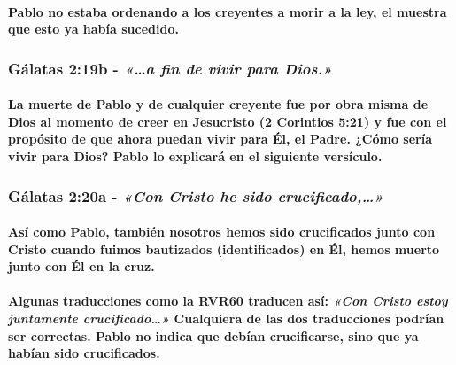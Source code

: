 \documentclass[11a pt,twoside]{article}
\newcommand{\scripture}[1]{%
  {\fontsize{12pt}{16pt}\selectfont\ScriptureFont\itshape #1}%
}
\let\oldsubsubsection\subsubsection
\renewcommand{\subsubsection}{\needspace{4\baselineskip}\oldsubsubsection}
\let\oldparagraph\paragraph
\renewcommand{\paragraph}{\needspace{3\baselineskip}\oldparagraph}
\begin{document}
\paragraph{Pablo no estaba ordenando a los creyentes a morir a la ley,
el muestra que esto ya había
sucedido.}\label{pablo-no-estaba-ordenando-a-los-creyentes-a-morir-a-la-ley-el-muestra-que-esto-ya-habuxeda-sucedido.}

\subsubsection{\texorpdfstring{Gálatas 2:19b -
\scripture{«…a fin de vivir para Dios.»}}{Gálatas 2:19b - }}\label{guxe1latas-219b---a-fin-de-vivir-para-dios.}

\paragraph{La muerte de Pablo y de cualquier creyente fue por obra misma
de Dios al momento de creer en Jesucristo (2 Corintios 5:21) y fue con
el propósito de que ahora puedan vivir para Él, el Padre. ¿Cómo sería
vivir para Dios? Pablo lo explicará en el siguiente
versículo.}\label{la-muerte-de-pablo-y-de-cualquier-creyente-fue-por-obra-misma-de-dios-al-momento-de-creer-en-jesucristo-2-corintios-521-y-fue-con-el-propuxf3sito-de-que-ahora-puedan-vivir-para-uxe9l-el-padre.-cuxf3mo-seruxeda-vivir-para-dios-pablo-lo-explicaruxe1-en-el-siguiente-versuxedculo.}

\subsubsection{\texorpdfstring{Gálatas 2:20a -
\scripture{«Con Cristo he sido crucificado,…»}}{Gálatas 2:20a - }}\label{guxe1latas-220a---con-cristo-he-sido-crucificado}

\paragraph{Así como Pablo, también nosotros hemos sido crucificados
junto con Cristo cuando fuimos bautizados (identificados) en Él, hemos
muerto junto con Él en la
cruz.}\label{asuxed-como-pablo-tambiuxe9n-nosotros-hemos-sido-crucificados-junto-con-cristo-cuando-fuimos-bautizados-identificados-en-uxe9l-hemos-muerto-junto-con-uxe9l-en-la-cruz.}

\paragraph{\texorpdfstring{Algunas traducciones como la RVR60 traducen
así: \scripture{«Con Cristo estoy juntamente crucificado…»} Cualquiera
de las dos traducciones podrían ser correctas. Pablo no indica que
debían crucificarse, sino que ya habían sido
crucificados.}{Algunas traducciones como la RVR60 traducen así:  Cualquiera de las dos traducciones podrían ser correctas. Pablo no indica que debían crucificarse, sino que ya habían sido crucificados.}}\label{algunas-traducciones-como-la-rvr60-traducen-asuxed-con-cristo-estoy-juntamente-crucificado-cualquiera-de-las-dos-traducciones-podruxedan-ser-correctas.-pablo-no-indica-que-debuxedan-crucificarse-sino-que-ya-habuxedan-sido-crucificados.}
\end{document}
